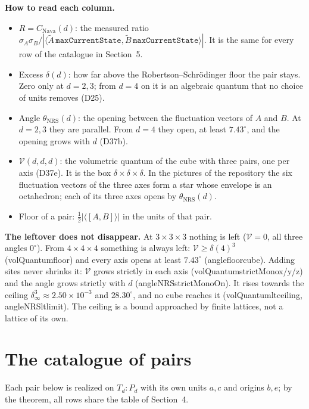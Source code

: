 \documentclass[11pt,a4paper]{article}
\newcommand{\leanus}{\textunderscore\allowbreak}
\newcommand{\lean}[1]{{\small\ttfamily\let\_\leanus #1}}
\begin{document}
\textbf{How to read each column.}
\begin{itemize}
  \item $R=C_{\mathrm{Nava}}(d)$: the measured ratio $\sigma_A\sigma_B/|\langle\tilde A\,\mathtt{maxCurrentState},\tilde B\,\mathtt{maxCurrentState}\rangle|$.
        It is the same for every row of the catalogue in Section~5.
  \item Excess $\delta(d)$: how far above the Robertson--Schrödinger floor the pair stays.
        Zero only at $d=2,3$; from $d=4$ on it is an algebraic quantum that no choice of
        units removes (\lean{D25}).
  \item Angle $\theta_{\mathrm{NRS}}(d)$: the opening between the fluctuation vectors of $A$
        and $B$. At $d=2,3$ they are parallel. From $d=4$ they open, at least $7.43^\circ$,
        and the opening grows with $d$ (\lean{D37b}).
  \item $\mathcal V(d,d,d)$: the volumetric quantum of the cube with three pairs, one per axis
        (\lean{D37e}). It is the box $\delta\times\delta\times\delta$. In the pictures of the
        repository the six fluctuation vectors of the three axes form a star whose envelope
        is an octahedron; each of its three axes opens by $\theta_{\mathrm{NRS}}(d)$.
  \item Floor of a pair: $\tfrac12|\langle[A,B]\rangle|$ in the units of that pair.
\end{itemize}

\textbf{The leftover does not disappear.} At $3\times3\times3$ nothing is left
($\mathcal V=0$, all three angles $0^\circ$). From $4\times4\times4$ something is always
left: $\mathcal V\ge\delta(4)^3$ (\lean{volQuantum\_floor}) and every axis opens at least
$7.43^\circ$ (\lean{angle\_floor\_cube}). Adding sites never shrinks it: $\mathcal V$ grows
strictly in each axis (\lean{volQuantum\_strictMono\_x/y/z}) and the angle grows
strictly with $d$ (\lean{angleNRS\_strictMonoOn}). It rises towards the ceiling
$\delta_\infty^3\approx2.50\times10^{-3}$ and $28.30^\circ$, and no cube reaches it
(\lean{volQuantum\_lt\_ceiling}, \lean{angleNRS\_lt\_limit}). The ceiling is a bound
approached by finite lattices, not a lattice of its own.

\section{The catalogue of pairs}

Each pair below is realized on $T_d{:}P_d$ with its own units $a,c$ and origins $b,e$; by the
theorem, all rows share the table of Section~4.
\end{document}
